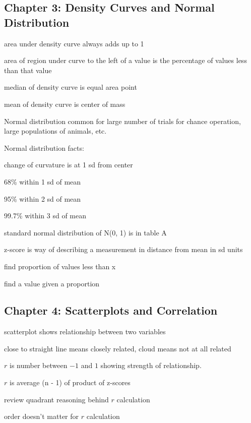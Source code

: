 \documentclass[landscape]{exam}
\begin{document}
  \subsection{Chapter 3: Density Curves and Normal Distribution}
  \begin{itemize*}
    \item area under density curve always adds up to 1
    \item area of region under curve to the left of a value is the percentage of
      values less than that value
    \item median of density curve is equal area point
    \item mean of density curve is center of mass 
    \item Normal distribution common for large number of trials for chance
      operation, large populations of animals, etc.
    \item Normal distribution facts:
      \begin{itemize*}
        \item change of curvature is at 1 sd from center
        \item 68\% within 1 sd of mean
        \item 95\% within 2 sd of mean
        \item 99.7\% within 3 sd of mean
        \item standard normal distribution of N(0, 1) is in table A
      \end{itemize*}

    \item z-score is way of describing a measurement in distance from mean in sd
      units

    \item find proportion of values less than x

    \item find a value given a proportion

  \end{itemize*}

  \subsection{Chapter 4: Scatterplots and Correlation}

  \begin{itemize*}
    \item scatterplot shows relationship between two variables
    \item close to straight line means closely related, cloud means not at all
      related
    \item $r$ is number between $-1$ and $1$ showing strength of relationship.  

    \item $r$ is average (n - 1) of product of z-scores

    \item review quadrant reasoning behind $r$ calculation

    \item order doesn't matter for $r$ calculation
  \end{itemize*}
\end{document}
